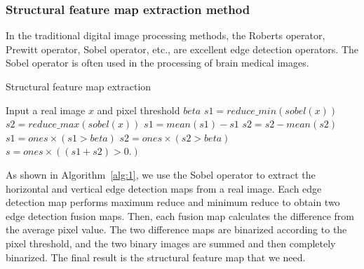\documentclass{ecai}
\begin{document}
\subsubsection{Structural feature map extraction method}
In the traditional digital image processing methods, the Roberts operator, Prewitt operator, Sobel operator, etc., are excellent edge detection operators. The Sobel operator is often used in the processing of brain medical images.
\begin{algorithm}
	\caption{Structural feature map extraction}
	\label{alg:1}
	\begin{algorithmic}[1]
		\State Input a real image $x$ and pixel threshold $beta$
		\State $s1 = reduce\_min(sobel(x))$
		\State $s2 = reduce\_max(sobel(x))$
		\State $s1 = mean(s1) - s1$
		\State $s2 = s2 - mean(s2)$
		\State $s1 = ones \times (s1 > beta)$
		\State $s2 = ones \times (s2 > beta)$
		\State $s = ones \times ((s1 + s2)> 0.)$
	\end{algorithmic}  
\end{algorithm}
As shown in Algorithm~\ref{alg:1}, we use the Sobel operator to extract the horizontal and vertical edge detection maps from a real image. Each edge detection map performs maximum reduce and minimum reduce to obtain two edge detection fusion maps. Then, each fusion map calculates the difference from the average pixel value. The two difference maps are binarized according to the pixel threshold, and the two binary images are summed and then completely binarized. The final result is the structural feature map that we need.
\end{document}
